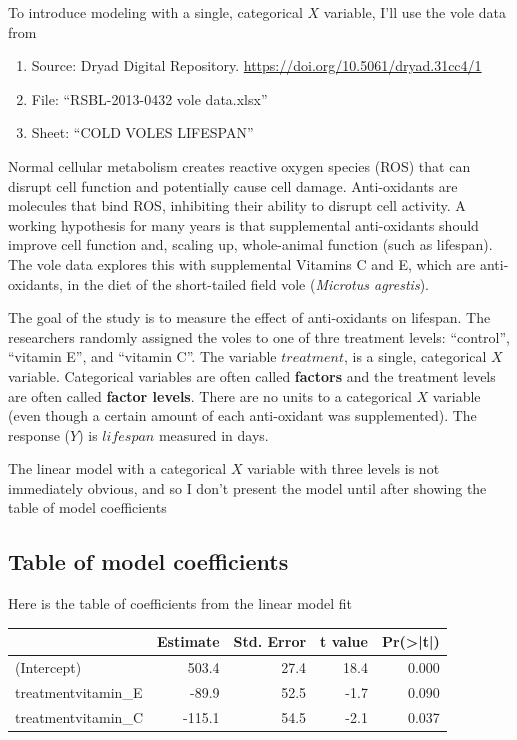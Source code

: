 \documentclass[]{book}
\providecommand{\tightlist}{%
  \setlength{\itemsep}{0pt}\setlength{\parskip}{0pt}}
\theoremstyle{definition}
\theoremstyle{definition}
\theoremstyle{definition}
\theoremstyle{remark}
\begin{document}
To introduce modeling with a single, categorical \(X\) variable, I'll
use the vole data from

\begin{enumerate}
\def\labelenumi{\arabic{enumi}.}
\tightlist
\item
  Source: Dryad Digital Repository.
  \url{https://doi.org/10.5061/dryad.31cc4/1}
\item
  File: ``RSBL-2013-0432 vole data.xlsx''
\item
  Sheet: ``COLD VOLES LIFESPAN''
\end{enumerate}

Normal cellular metabolism creates reactive oxygen species (ROS) that
can disrupt cell function and potentially cause cell damage.
Anti-oxidants are molecules that bind ROS, inhibiting their ability to
disrupt cell activity. A working hypothesis for many years is that
supplemental anti-oxidants should improve cell function and, scaling up,
whole-animal function (such as lifespan). The vole data explores this
with supplemental Vitamins C and E, which are anti-oxidants, in the diet
of the short-tailed field vole (\emph{Microtus agrestis}).

The goal of the study is to measure the effect of anti-oxidants on
lifespan. The researchers randomly assigned the voles to one of thre
treatment levels: ``control'', ``vitamin E'', and ``vitamin C''. The
variable \(treatment\), is a single, categorical \(X\) variable.
Categorical variables are often called \textbf{factors} and the
treatment levels are often called \textbf{factor levels}. There are no
units to a categorical \(X\) variable (even though a certain amount of
each anti-oxidant was supplemented). The response (\(Y\)) is
\(lifespan\) measured in days.

The linear model with a categorical \(X\) variable with three levels is
not immediately obvious, and so I don't present the model until after
showing the table of model coefficients

\subsection{Table of model
coefficients}\label{table-of-model-coefficients}

Here is the table of coefficients from the linear model fit

\begin{tabular}{l|r|r|r|r}
\hline
  & Estimate & Std. Error & t value & Pr(>|t|)\\
\hline
(Intercept) & 503.4 & 27.4 & 18.4 & 0.000\\
\hline
treatmentvitamin\_E & -89.9 & 52.5 & -1.7 & 0.090\\
\hline
treatmentvitamin\_C & -115.1 & 54.5 & -2.1 & 0.037\\
\hline
\end{tabular}
\end{document}
